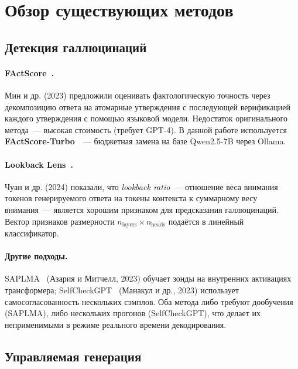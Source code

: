 \documentclass[a4paper,12pt]{extarticle}
\begin{document}
\section{Обзор существующих методов}
\label{sec:related}

\subsection{Детекция галлюцинаций}

\paragraph{FActScore~\cite{factscore}.}
Мин и др. (2023) предложили оценивать фактологическую точность через
декомпозицию ответа на атомарные утверждения с последующей верификацией
каждого утверждения с помощью языковой модели. Недостаток оригинального
метода~--- высокая стоимость (требует GPT-4).
В данной работе используется \textbf{FActScore-Turbo}~\cite{factscore_turbo_vk}~---
бюджетная замена на базе Qwen2.5-7B через Ollama.

\paragraph{Lookback Lens~\cite{lookback}.}
Чуан и др. (2024) показали, что \textit{lookback ratio}~--- отношение веса
внимания токенов генерируемого ответа на токены контекста к суммарному весу
внимания~--- является хорошим признаком для предсказания галлюцинаций.
Вектор признаков размерности $n_\text{layers} \times n_\text{heads}$ подаётся
в линейный классификатор.

\paragraph{Другие подходы.}
SAPLMA~\cite{saplma} (Азария и Митчелл, 2023) обучает зонды на внутренних
активациях трансформера; SelfCheckGPT~\cite{selfcheckgpt} (Манакул и др., 2023)
использует самосогласованность нескольких сэмплов. Оба метода либо требуют
дообучения (SAPLMA), либо нескольких прогонов (SelfCheckGPT), что делает их
неприменимыми в режиме реального времени декодирования.

\subsection{Управляемая генерация}
\end{document}
